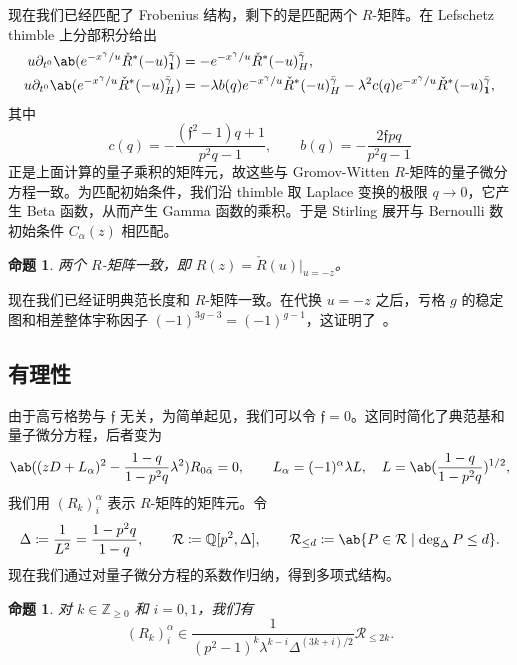 \documentclass{amsart}
\newtheorem{prop}[thm]{命题}
\theoremstyle{definition}
\theoremstyle{remark}
\theoremstyle{plain}
\theoremstyle{definition}
\theoremstyle{remark}
\newcommand{\Z}{\mathbb{Z}}
\newcommand{\Q}{\mathbb{Q}}
\newcommand{\mc}[1]{\mathcal{#1}}
\newcommand{\mf}[1]{\mathfrak{#1}}
\newcommand{\1}{\mathbf{1}}
\newcommand{\2}{\mathbf{2}}
\newcommand{\3}{\mathbf{3}}
\begin{document}
现在我们已经匹配了 Frobenius 结构，剩下的是匹配两个 \(R\)-矩阵。在 Lefschetz thimble 上分部积分给出
\begin{align*}
    u \partial_{t^0}\ab(e^{-x^{\gamma}/u}\check{R}^*(-u)^{\bar{\gamma}}_{\1}) &= -e^{-x^{\gamma}/u}\check{R}^*(-u)^{\bar{\gamma}}_H, \\
    u\partial_{t^0}\ab(e^{-x^{\gamma}/u}\check{R}^*(-u)^{\bar{\gamma}}_H) &= -\lambda b(q)e^{-x^{\gamma}/u}\check{R}^*(-u)^{\bar{\gamma}}_H - \lambda^2 c(q) e^{-x^{\gamma}/u}\check{R}^*(-u)^{\bar{\gamma}}_{\1},
\end{align*}
其中
\[ c(q) = -\frac{(\mf{f}^2-1)q+1}{p^2q-1}, \qquad b(q) = -\frac{2\mf{f}pq}{p^2q-1} \]
正是上面计算的量子乘积的矩阵元，故这些与 Gromov-Witten \(R\)-矩阵的量子微分方程一致。为匹配初始条件，我们沿 thimble 取 Laplace 变换的极限 \(q \to 0\)，它产生 Beta 函数，从而产生 Gamma 函数的乘积。于是 Stirling 展开与 Bernoulli 数初始条件 \(C_{\alpha}(z)\) 相匹配。

\begin{prop}%
\label{prop:R matrices coincide}
    两个 \(R\)-矩阵一致，即 \(R(z) = \check{R}(u)|_{u=-z}\)。
\end{prop}

现在我们已经证明典范长度和 \(R\)-矩阵一致。在代换 \(u = -z\) 之后，亏格 \(g\) 的稳定图和相差整体宇称因子 \((-1)^{3g-3} = (-1)^{g-1}\)，这证明了~。

\subsection{有理性}%
\label{sub:Rationality}

由于高亏格势与 \(\mf{f}\) 无关，为简单起见，我们可以令 \(\mf{f} = 0\)。这同时简化了典范基和量子微分方程，后者变为
\[ \ab((zD+L_{\alpha})^2 - \frac{1-q}{1-p^2q}\lambda^2)R_{0\bar{\alpha}} = 0, \qquad L_{\alpha} = (-1)^{\alpha}\lambda L, \quad L = \ab(\frac{1-q}{1-p^2q})^{1/2}, \]
我们用 \((R_k)_i^{\alpha}\) 表示 \(R\)-矩阵的矩阵元。令
\[ \Delta \coloneqq \frac{1}{L^2} = \frac{1-p^2q}{1-q}, \qquad \mc{R} \coloneqq \Q[p^2,\Delta], \qquad \mc{R}_{\leq d} \coloneqq \ab\{P \in \mc{R} \mid \deg_{\Delta} P \leq d\}. \]
现在我们通过对量子微分方程的系数作归纳，得到多项式结构。

\begin{prop}%
\label{prop:R matrix polynomiality}
    对 \(k \in \Z_{\geq0}\) 和 \(i = 0,1\)，我们有
    \[ (R_k)_i^{\alpha} \in \frac{1}{(p^2-1)^k \lambda^{k-i}\Delta^{(3k+i)/2}}\mc{R}_{\leq 2k}. \]
\end{prop}
\end{document}
